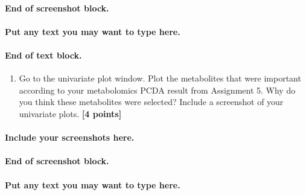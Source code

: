 \documentclass[
]{article}
\providecommand{\tightlist}{%
  \setlength{\itemsep}{0pt}\setlength{\parskip}{0pt}}
\begin{document}
\hypertarget{end-of-screenshot-block.}{%
\paragraph{\texorpdfstring{End of screenshot block.\\
}{End of screenshot block. }}\label{end-of-screenshot-block.}}

\hfill\break

\hypertarget{put-any-text-you-may-want-to-type-here.-32}{%
\paragraph{Put any text you may want to type
here.}\label{put-any-text-you-may-want-to-type-here.-32}}

\hypertarget{end-of-text-block.-34}{%
\paragraph{End of text block.}\label{end-of-text-block.-34}}

\begin{enumerate}
\def\labelenumi{\Alph{enumi})}
\setcounter{enumi}{1}
\tightlist
\item
  Go to the univariate plot window. Plot the metabolites that were
  important according to your metabolomics PCDA result from Assignment
  5. Why do you think these metabolites were selected? Include a
  screenshot of your univariate plots. \textbf{{[}4 points{]}}
\end{enumerate}

\hypertarget{include-your-screenshots-here.-1}{%
\paragraph{\texorpdfstring{Include your screenshots here.\\
}{Include your screenshots here. }}\label{include-your-screenshots-here.-1}}

\hypertarget{end-of-screenshot-block.-1}{%
\paragraph{\texorpdfstring{End of screenshot block.\\
}{End of screenshot block. }}\label{end-of-screenshot-block.-1}}

\hfill\break

\hypertarget{put-any-text-you-may-want-to-type-here.-33}{%
\paragraph{Put any text you may want to type
here.}\label{put-any-text-you-may-want-to-type-here.-33}}
\end{document}
